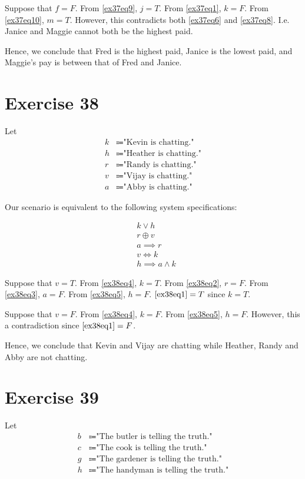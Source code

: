\documentclass{article}
\begin{document}
Suppose that $f = F$. From \eqref{ex37eq9}, $j = T$. From \eqref{ex37eq1}, $k = F$. From \eqref{ex37eq10}, $m = T$. However, this contradicts both \eqref{ex37eq6} and \eqref{ex37eq8}. I.e. Janice and Maggie cannot both be the highest paid.

Hence, we conclude that Fred is the highest paid, Janice is the lowest paid, and Maggie's pay is between that of Fred and Janice.

\pagebreak

\section{Exercise 38}
Let
\begin{align*}
	k & \Coloneqq \text{"Kevin is chatting."}   \\
	h & \Coloneqq \text{"Heather is chatting."} \\
	r & \Coloneqq \text{"Randy is chatting."}   \\
	v & \Coloneqq \text{"Vijay is chatting."}   \\
	a & \Coloneqq \text{"Abby is chatting."}
\end{align*}

Our scenario is equivalent to the following system specifications:

\begin{align}
	 & k \lor h \label{ex38eq1}             \\
	 & r \oplus v \label{ex38eq2}           \\
	 & a \implies r \label{ex38eq3}         \\
	 & v \iff k \label{ex38eq4}             \\
	 & h \implies a \land k \label{ex38eq5}
\end{align}

Suppose that $v = T$. From \eqref{ex38eq4}, $k = T$. From \eqref{ex38eq2}, $r = F$. From \eqref{ex38eq3}, $a = F$. From \eqref{ex38eq5}, $h = F$. $\eqref{ex38eq1} = T$ since $k = T$.

Suppose that $v = F$. From \eqref{ex38eq4}, $k = F$. From \eqref{ex38eq5}, $h = F$.  However, this a contradiction since $\eqref{ex38eq1} = F$.

Hence, we conclude that Kevin and Vijay are chatting while Heather, Randy and Abby are not chatting.

\pagebreak

\section{Exercise 39}
Let
\begin{align*}
	b & \Coloneqq \text{"The butler is telling the truth."}   \\
	c & \Coloneqq \text{"The cook is telling the truth."}     \\
	g & \Coloneqq \text{"The gardener is telling the truth."} \\
	h & \Coloneqq \text{"The handyman is telling the truth."}
\end{align*}
\end{document}
